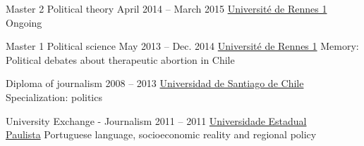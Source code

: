 


%
%




\def\tbflanguage{english}



\begin{coordinatelist}
\end{coordinatelist}










%
%




\begin{yearlist}

\item[Master 2 Political theory]{April 2014 -- March 2015}
     {\href{https://formations.univ-rennes1.fr/formations/master-2-theorie-politique}{Université de Rennes 1}}
     {Ongoing}
     

 \item[Master 1 Political science]{May 2013 -- Dec. 2014}
     {\href{https://formations.univ-rennes1.fr/formations/master-1-science-politique}{Université de Rennes 1}}
	 {Memory: Political debates about therapeutic abortion in Chile}


\item[Diploma of journalism]{2008 -- 2013}
     {\href{http://periodismo.usach.cl/} {Universidad de Santiago de Chile}}
     {Specialization: politics}


\item[University Exchange - Journalism]{2011 -- 2011}
     {\href{http://www.unesp.br/} {Universidade Estadual \\ Paulista}}
     {Portuguese language, socioeconomic reality and regional policy}


\end{yearlist}





